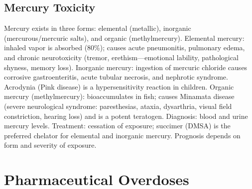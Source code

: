 \subsection{Mercury Toxicity}
\label{sec:Mercury Toxicity}
Mercury exists in three forms: elemental (metallic), inorganic (mercurous/mercuric salts), and organic (methylmercury). Elemental mercury: inhaled vapor is absorbed (80\%); causes acute pneumonitis, pulmonary edema, and chronic neurotoxicity (tremor, erethism---emotional lability, pathological shyness, memory loss). Inorganic mercury: ingestion of mercuric chloride causes corrosive gastroenteritis, acute tubular necrosis, and nephrotic syndrome. Acrodynia (Pink disease) is a hypersensitivity reaction in children. Organic mercury (methylmercury): bioaccumulates in fish; causes Minamata disease (severe neurological syndrome: paresthesias, ataxia, dysarthria, visual field constriction, hearing loss) and is a potent teratogen. Diagnosis: blood and urine mercury levels. Treatment: cessation of exposure; succimer (DMSA) is the preferred chelator for elemental and inorganic mercury. Prognosis depends on form and severity of exposure.

\section{Pharmaceutical Overdoses}








\label{sec:Pharmaceutical Overdoses}

